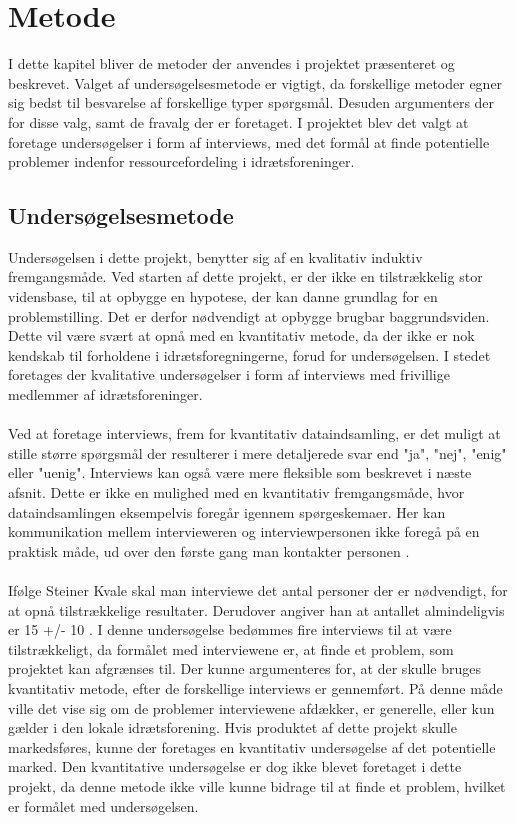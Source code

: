 \chapter{Metode}\label{ch:chlabel}
I dette kapitel bliver de metoder der anvendes i projektet præsenteret og beskrevet. Valget af undersøgelsesmetode er vigtigt, da forskellige metoder egner sig bedst til besvarelse af forskellige typer spørgsmål. Desuden argumenters der for disse valg, samt de fravalg der er foretaget. I projektet blev det valgt at foretage undersøgelser i form af interviews, med det formål at finde potentielle problemer indenfor ressourcefordeling i idrætsforeninger.

\section{Undersøgelsesmetode}
Undersøgelsen i dette projekt, benytter sig af en kvalitativ induktiv fremgangsmåde. 
Ved starten af dette projekt, er der ikke en tilstrækkelig stor vidensbase, til at opbygge en hypotese, der kan danne grundlag for en problemstilling. Det er derfor nødvendigt at opbygge brugbar baggrundsviden. Dette vil være svært at opnå med en kvantitativ metode, da der ikke er nok kendskab til forholdene i idrætsforegningerne, forud for undersøgelsen. I stedet foretages der kvalitative undersøgelser i form af interviews med frivillige medlemmer af idrætsforeninger.
\\
\\
Ved at foretage interviews, frem for kvantitativ dataindsamling, er det muligt at stille større spørgsmål der resulterer i mere detaljerede svar end "ja", "nej", "enig" eller "uenig". Interviews kan også være mere fleksible som beskrevet i næste afsnit. Dette er ikke en mulighed med en kvantitativ fremgangsmåde, hvor dataindsamlingen eksempelvis foregår igennem spørgeskemaer. Her kan kommunikation mellem intervieweren og interviewpersonen ikke foregå på en praktisk måde, ud over den første gang man kontakter personen \citep{kvale2015}.
\\
\\
Ifølge Steiner Kvale skal man interviewe det antal personer der er nødvendigt, for at opnå tilstrækkelige resultater. Derudover angiver han at antallet almindeligvis er 15 +/- 10 \cite{kvale2015}. I denne undersøgelse bedømmes fire interviews til at være tilstrækkeligt, da formålet med interviewene er, at finde et problem, som projektet kan afgrænses til. Der kunne argumenteres for, at der skulle bruges kvantitativ metode, efter de forskellige interviews er gennemført. På denne måde ville det vise sig om de problemer interviewene afdækker, er generelle, eller kun gælder i den lokale idrætsforening. Hvis produktet af dette projekt skulle markedsføres, kunne der foretages en kvantitativ undersøgelse af det potentielle marked. Den kvantitative undersøgelse er dog ikke blevet foretaget i dette projekt, da denne metode ikke ville kunne bidrage til at finde et problem, hvilket er formålet med undersøgelsen.
